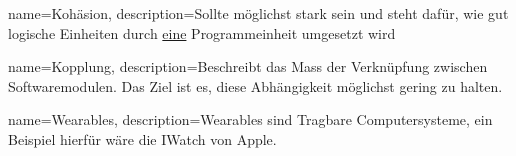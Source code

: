 {
  name=Kohäsion,
  description={Sollte möglichst stark sein und steht dafür,
    wie gut logische Einheiten durch \underline{eine} Programmeinheit umgesetzt wird}
}

{
  name=Kopplung,
  description={Beschreibt das Mass der Verknüpfung zwischen Softwaremodulen.
    Das Ziel ist es, diese Abhängigkeit möglichst gering zu halten.}
}

{
  name=Wearables,
  description={Wearables sind Tragbare Computersysteme, ein Beispiel hierfür wäre die IWatch von Apple.}
}



